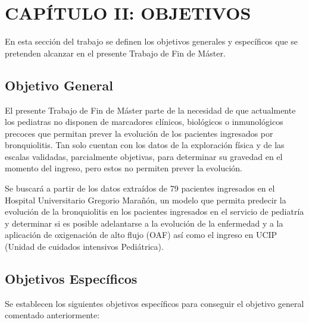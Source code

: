 \section{CAPÍTULO II: OBJETIVOS}\label{sec:objectives}

En esta sección del trabajo se definen los objetivos generales y específicos que se pretenden alcanzar en el presente Trabajo de Fin de Máster. 

\subsection{Objetivo General}

El presente Trabajo de Fin de Máster parte de la necesidad de que actualmente los pediatras no disponen de marcadores clínicos, biológicos o inmunológicos precoces que permitan prever la evolución de los pacientes ingresados por bronquiolitis. Tan solo cuentan con los datos de la exploración física y de las escalas validadas, parcialmente objetivas, para determinar su gravedad en el momento del ingreso, pero estos no permiten prever la evolución. 

Se buscará a partir de los datos extraídos de 79 pacientes ingresados en el Hospital Universitario Gregorio Marañón, un modelo que permita predecir la evolución de la bronquiolitis en los pacientes ingresados en el servicio de pediatría y determinar si es posible adelantarse a la evolución de la enfermedad y a la aplicación de oxigenación de alto flujo (OAF) así como el ingreso en UCIP (Unidad de cuidados intensivos Pediátrica).

\subsection{Objetivos Específicos}

Se establecen los siguientes objetivos específicos para conseguir el objetivo general comentado anteriormente:

